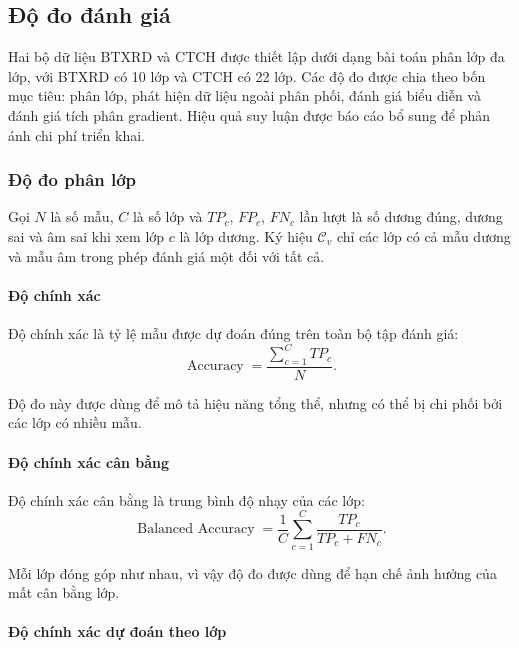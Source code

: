 \subsection{Độ đo đánh giá}
\label{sec:evaluation_metrics}
Hai bộ dữ liệu BTXRD và CTCH được thiết lập dưới dạng bài toán phân lớp đa lớp, với BTXRD có 10 lớp và CTCH có 22 lớp. Các độ đo được chia theo bốn mục tiêu: phân lớp, phát hiện dữ liệu ngoài phân phối, đánh giá biểu diễn và đánh giá tích phân gradient. Hiệu quả suy luận được báo cáo bổ sung để phản ánh chi phí triển khai.

\subsubsection{Độ đo phân lớp}

Gọi $N$ là số mẫu, $C$ là số lớp và $TP_c$, $FP_c$, $FN_c$ lần lượt là số dương đúng, dương sai và âm sai khi xem lớp $c$ là lớp dương. Ký hiệu $\mathcal{C}_v$ chỉ các lớp có cả mẫu dương và mẫu âm trong phép đánh giá một đối với tất cả.

\paragraph{Độ chính xác}

Độ chính xác là tỷ lệ mẫu được dự đoán đúng trên toàn bộ tập đánh giá:
\begin{equation}
\operatorname{Accuracy}=\frac{\sum_{c=1}^{C}TP_c}{N}.
\label{eq:ch4_accuracy}
\end{equation}

Độ đo này được dùng để mô tả hiệu năng tổng thể, nhưng có thể bị chi phối bởi các lớp có nhiều mẫu.

\paragraph{Độ chính xác cân bằng}

Độ chính xác cân bằng \cite{Brodersen2010BalancedAcc} là trung bình độ nhạy của các lớp:
\begin{equation}
\operatorname{Balanced\ Accuracy}
=\frac{1}{C}\sum_{c=1}^{C}\frac{TP_c}{TP_c+FN_c}.
\label{eq:ch4_balanced_accuracy}
\end{equation}

Mỗi lớp đóng góp như nhau, vì vậy độ đo được dùng để hạn chế ảnh hưởng của mất cân bằng lớp.

\paragraph{Độ chính xác dự đoán theo lớp}

